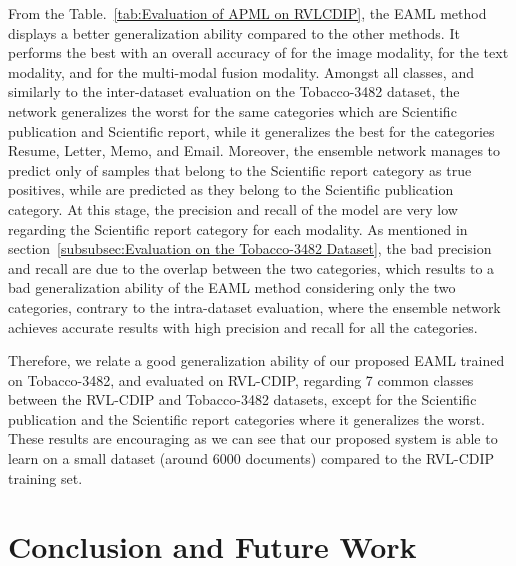 \documentclass[twocolumn]{svjour3}
\begin{document}
From the Table.~\ref{tab:Evaluation of APML on RVLCDIP}, the EAML method displays a better generalization ability compared to the other methods. It performs the best with an overall accuracy of  for the image modality,  for the text modality, and  for the multi-modal fusion modality. Amongst all classes, and similarly to the inter-dataset evaluation on the Tobacco-3482 dataset, the network generalizes the worst for the same categories which are Scientific publication and Scientific report, while it generalizes the best for the categories Resume, Letter, Memo, and Email. Moreover, the ensemble network manages to predict only  of samples that belong to the Scientific report category as true positives, while  are predicted as they belong to the Scientific publication category. At this stage, the precision and recall of the model are very low regarding the Scientific report category for each modality. As mentioned in section~\ref{subsubsec:Evaluation on the Tobacco-3482 Dataset}, the bad precision and recall are due to the overlap between the two categories, which results to a bad generalization ability of the EAML method considering only the two categories, contrary to the intra-dataset evaluation, where the ensemble network achieves accurate results with high precision and recall for all the categories.

Therefore, we relate a good generalization ability of our proposed EAML trained on Tobacco-3482, and evaluated on RVL-CDIP, regarding 7 common classes between the RVL-CDIP and Tobacco-3482 datasets, except for the Scientific publication and the Scientific report categories where it generalizes the worst. These results are encouraging as we can see that our proposed system is able to learn on a small dataset (around 6000 documents) compared to the RVL-CDIP training set.

\section{Conclusion and Future Work}
\label{sec:Conclusion and Future Work}
\end{document}
